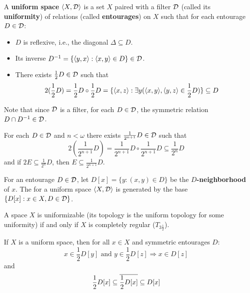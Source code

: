 



\begin{definition}
  A \textbf{uniform space} $\langle X,\mathcal{D}\rangle$ is a set $X$ paired with a filter $\mathcal{D}$ (called its \textbf{uniformity}) of relations (called \textbf{entourages}) on $X$ such that for each entourage $D\in \mathcal{D}$:
    \begin{itemize}
      \item $D$ is reflexive, i.e., the diagonal $\Delta\subseteq D$.
      \item Its inverse $D^{-1}=\{\langle y,x\rangle:\langle x,y\rangle\in D\}\in \mathcal{D}$.
      \item There exists $\frac{1}{2}D\in\mathcal{D}$ such that 
        \[
          2(\frac{1}{2}D)=\frac{1}{2}D\circ\frac{1}{2}D=\{\langle x,z\rangle:\exists y(\langle x,y\rangle,\langle y,z\rangle\in\frac{1}{2}D)\}\subseteq D
        \]
    \end{itemize}
  Note that since $\mathcal{D}$ is a filter, for each $D\in\mathcal{D}$, the symmetric relation $D\cap D^{-1}\in \mathcal{D}$.
\end{definition}

\begin{proposition}
For each $D\in\mathcal{D}$ and $n<\omega$ there exists $\frac{1}{2^{n+1}}D\in\mathcal{D}$ such that 
  \[2(\frac{1}{2^{n+1}}D)=\frac{1}{2^{n+1}}D\circ \frac{1}{2^{n+1}}D\subseteq \frac{1}{2^{n}}D\]
and if $2E\subseteq \frac{1}{2^{n}}D$, then $E\subseteq \frac{1}{2^{n+1}}D$.
\end{proposition}

\begin{definition}
  For an entourage $D\in\mathcal{D}$, let $D[x]=\{y:(x,y)\in D\}$ be the \textbf{$D$-neighborhood} of $x$. The  for a uniform space $\langle X,\mathcal{D}\rangle$ is generated by the base $\{D[x]:x\in X,D\in\mathcal{D}\}$.
\end{definition}

\begin{theorem}
  A space $X$ is uniformizable (its topology is the uniform topology for some uniformity) if and only if $X$ is completely regular ($T_{3\frac{1}{2}}$).
\end{theorem}

\begin{proposition}
  If $X$ is a uniform space, then for all $x\in X$ and symmetric entourages $D$:
    \[
      x\in \frac{1}{2}D[y]\text{ and } y\in\frac{1}{2}D[z] \Rightarrow x\in D[z]
    \]
  and
    \[
      \frac{1}{2}D[x]\subseteq \overline{\frac{1}{2}D[x]}\subseteq D[x]
    \]
\end{proposition}

